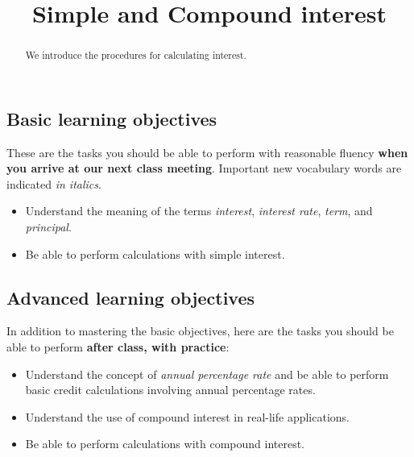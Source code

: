 \documentclass{ximera}
\title{Simple and Compound interest}
\begin{document}
\begin{abstract}
We introduce the procedures for calculating interest.
\end{abstract}
\maketitle

\subsection*{Basic learning objectives}

These are the tasks you should be able to perform with reasonable fluency \textbf{when you arrive at our next class meeting}. Important new vocabulary words are indicated \emph{in italics}. 

\begin{itemize}
	\item Understand the meaning of the terms \emph{interest}, \emph{interest rate}, \emph{term}, and \emph{principal}.
    \item Be able to perform calculations with simple interest.
\end{itemize}

\subsection*{Advanced learning objectives}

In addition to mastering the basic objectives, here are the tasks you should be able to perform \textbf{after class, with practice}: 

\begin{itemize}
	\item Understand the concept of \emph{annual percentage rate} and be able to perform basic credit calculations involving annual percentage rates.
	\item Understand the use of compound interest in real-life applications.
	\item Be able to perform calculations with compound interest.
\end{itemize}
\end{document}
